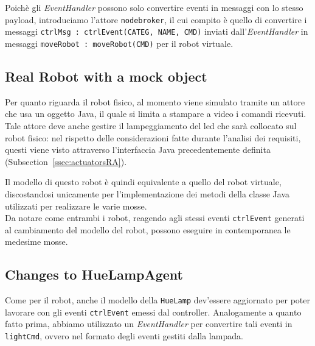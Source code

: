 \documentclass{../llncs}
\newcommand{\codescript}[1]{{\mbox{\small{\texttt{#1}}}}\xspace}
\newcommand{\xss}[1]{\subsectionname~\ref{ssec:#1}}
\newcommand{\subsectionname}{Subsection}
\begin{document}


Poichè gli \emph{EventHandler} possono solo convertire eventi in messaggi con lo stesso payload, introduciamo l'attore \texttt{nodebroker}, il cui compito è quello di convertire i messaggi \codescript{ctrlMsg : ctrlEvent(CATEG, NAME, CMD)} inviati dall'\emph{EventHandler} in messaggi \codescript{moveRobot : moveRobot(CMD)} per il robot virtuale.\\



\subsection{Real Robot with a mock object}
Per quanto riguarda il robot fisico, al momento viene simulato tramite un attore che usa un oggetto Java, il quale si limita a stampare a video i comandi ricevuti. Tale attore deve anche gestire il lampeggiamento del led che sarà collocato sul robot fisico: nel rispetto delle considerazioni fatte durante l'analisi dei requisiti, questi viene visto attraverso l'interfaccia Java precedentemente definita (\xss{actuatorsRA}).

Il modello di questo robot è quindi equivalente a quello del robot virtuale, discostandosi unicamente per l'implementazione dei metodi della classe Java utilizzati per realizzare le varie mosse.\\



Da notare come entrambi i robot, reagendo agli stessi eventi \codescript{ctrlEvent} generati al cambiamento del modello del robot, possono eseguire in contemporanea le medesime mosse.

\subsection{Changes to HueLampAgent}
Come per il robot, anche il modello della \texttt{HueLamp} dev'essere aggiornato per poter lavorare con gli eventi \codescript{ctrlEvent} emessi dal controller. Analogamente a quanto fatto prima, abbiamo utilizzato un \emph{EventHandler} per convertire tali eventi in \codescript{lightCmd}, ovvero nel formato degli eventi gestiti dalla lampada.\\
\end{document}
